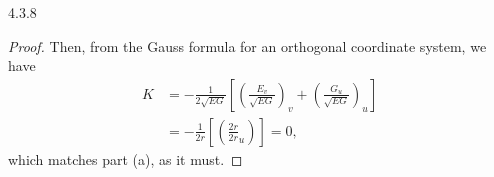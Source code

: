 \documentclass[11pt]{article}
\begin{document}
\begin{problem}{4.3.8}
\begin{enumerate}[label=(\alph*)]
\begin{proof}
      Then, from the Gauss formula for an orthogonal coordinate system, we have
      \begin{equation}
      \label{eq:18}
      \begin{aligned}
        K &= - \frac{1}{2 \sqrt{EG}} \left[ \left( \frac{E_v}{\sqrt{EG}} \right)_v + \left( \frac{G_u}{\sqrt{EG}} \right)_{u} \right] \\
        &= - \frac{1}{2r} \left[ \left( \frac{2r}{2r}_u \right) \right] = 0,
      \end{aligned}
      \end{equation}
      which matches part (a), as it must.
          \end{proof}
  \end{enumerate}
\end{problem}
\end{document}

